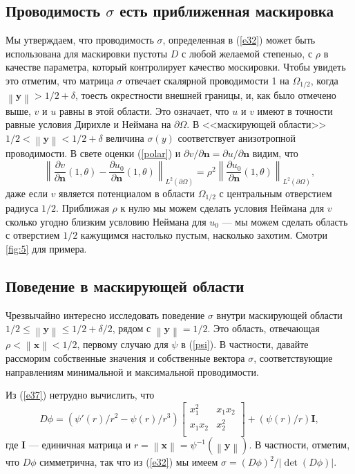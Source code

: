 \documentclass[a4paper, 12pt]{article}
\newcommand{\norm}[1]{\left\lVert#1\right\rVert}
\begin{document}
\subsection{Проводимость $\sigma$ есть приближенная маскировка}
Мы утверждаем, что проводимость $\sigma$, определенная в (\ref{e32}) может быть 
использована для маскировки пустоты $D$ с любой желаемой степенью, с $\rho$ в 
качестве параметра, который контролирует качество москировки. Чтобы увидеть это
отметим, что матрица $\sigma$ отвечает скалярной проводимости 1 на $\Omega_{1/2}$,
когда $\norm{\textbf{y}} > 1/2 + \delta$, тоесть окрестности внешней границы,
и, как было отмечено выше, $v$ и $u$ равны в этой области. Это означает, что 
$u$ и $v$ имеют в точности равные условия Дирихле и Неймана на $\partial \Omega$.
В <<маскирующей области>> $1/2 < \norm{\textbf{y}} < 1/2 + \delta$ величина
$\sigma(y)$ соответствует анизотропной проводимости. В свете оценки (\ref{polar})
и $\partial v/\partial \textbf{n} = \partial u/\partial \textbf{n}$ видим, что
\begin{equation}
\norm{\frac{\partial v}{\partial \textbf{n}}(1,\theta) - \frac{\partial u_0}
{\partial \textbf{n}}(1, \theta)}_{L^2(\partial \Omega)} = \rho^2 
\norm{\frac{\partial u_0}
{\partial \textbf{n}}(1, \theta)}_{L^2(\partial \Omega)},
\end{equation}
даже если $v$ является потенциалом в области $\Omega_{1/2}$ с центральным отверстием
радиуса $1/2$. Приближая $\rho$ к нулю мы можем сделать условия Неймана для $v$
сколько угодно близким усвловию Неймана для $u_0$ --- мы можем сделать область с
отверстием $1/2$ кажущимся настолько пустым, насколько захотим. Смотри \ref{fig:5}
для примера.
\subsection{Поведение в маскирующей области}
Чрезвычайно интересно исследовать поведение $\sigma$ внутри маскирующей области
$1/2 \le \norm{\textbf{y}} \le 1/2 + \delta/2$, рядом с $\norm{\textbf{y}} = 1/2$.
Это область, отвечающая $\rho < \norm{\textbf{x}} < 1/2$, первому случаю для $\psi$
в (\ref{psi}). В частности, давайте рассморим собственные значения и собственные
вектора $\sigma$, соответствующие направлениям минимальной и максимальной 
проводимости.

Из (\ref{e37}) нетрудно вычислить, что 
\begin{equation}\label{Dphi}
D\phi = (\psi'(r)/r^2-\psi(r)/r^3)
\begin{bmatrix}
  x_1^2 & x_1x_2  \\
  x_1x_2 & x_2^2	  \\
 \end{bmatrix}
 +(\psi(r)/r)\textbf{I},
\end{equation}
где $\textbf{I}$ --- единичная матрица и $r = \norm{\textbf{x}} = 
\psi^{-1}(\norm{\textbf{y}})$. В частности, отметим, что $D\phi$ симметрична, так что
из (\ref{e32}) мы имеем $\sigma = (D\phi)^2/|\det(D\phi)|$.
\end{document}
